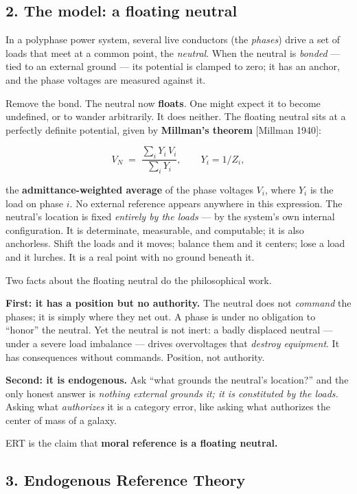 \documentclass[
]{article}
\begin{document}
\subsection{2. The model: a floating
neutral}\label{the-model-a-floating-neutral}

In a polyphase power system, several live conductors (the \emph{phases})
drive a set of loads that meet at a common point, the \emph{neutral}.
When the neutral is \emph{bonded} --- tied to an external ground --- its
potential is clamped to zero; it has an anchor, and the phase voltages
are measured against it.

Remove the bond. The neutral now \textbf{floats}. One might expect it to
become undefined, or to wander arbitrarily. It does neither. The
floating neutral sits at a perfectly definite potential, given by
\textbf{Millman's theorem} {[}Millman 1940{]}:

\[ V_N \;=\; \frac{\sum_i Y_i\,V_i}{\sum_i Y_i}, \qquad Y_i = 1/Z_i, \]

the \textbf{admittance-weighted average} of the phase voltages \(V_i\),
where \(Y_i\) is the load on phase \(i\). No external reference appears
anywhere in this expression. The neutral's location is fixed
\emph{entirely by the loads} --- by the system's own internal
configuration. It is determinate, measurable, and computable; it is also
anchorless. Shift the loads and it moves; balance them and it centers;
lose a load and it lurches. It is a real point with no ground beneath
it.

Two facts about the floating neutral do the philosophical work.

\textbf{First: it has a position but no authority.} The neutral does not
\emph{command} the phases; it is simply where they net out. A phase is
under no obligation to ``honor'' the neutral. Yet the neutral is not
inert: a badly displaced neutral --- under a severe load imbalance ---
drives overvoltages that \emph{destroy equipment}. It has consequences
without commands. Position, not authority.

\textbf{Second: it is endogenous.} Ask ``what grounds the neutral's
location?'' and the only honest answer is \emph{nothing external grounds
it; it is constituted by the loads.} Asking what \emph{authorizes} it is
a category error, like asking what authorizes the center of mass of a
galaxy.

ERT is the claim that \textbf{moral reference is a floating neutral.}

\subsection{3. Endogenous Reference
Theory}\label{endogenous-reference-theory}
\end{document}
